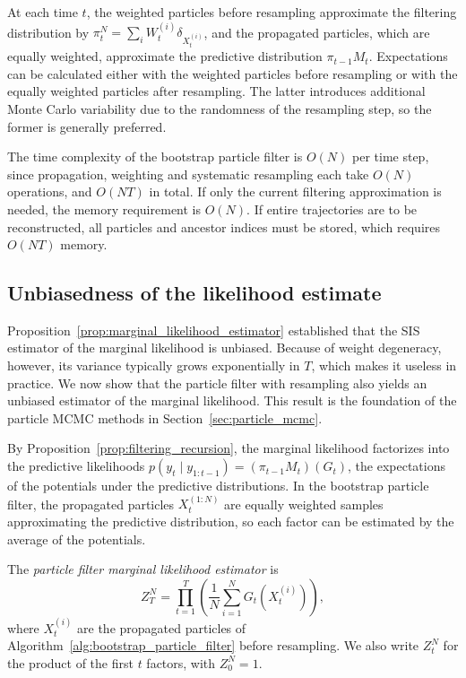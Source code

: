 At each time $t$, the weighted particles before resampling approximate the filtering distribution by $\pi_t^N = \sum_iW_t^{(i)}\delta_{X_t^{(i)}}$, and the propagated particles, which are equally weighted, approximate the predictive distribution $\pi_{t-1}M_t$. Expectations can be calculated either with the weighted particles before resampling or with the equally weighted particles after resampling. The latter introduces additional Monte Carlo variability due to the randomness of the resampling step, so the former is generally preferred.

The time complexity of the bootstrap particle filter is $O(N)$ per time step, since propagation, weighting and systematic resampling each take $O(N)$ operations, and $O(NT)$ in total. If only the current filtering approximation is needed, the memory requirement is $O(N)$. If entire trajectories are to be reconstructed, all particles and ancestor indices must be stored, which requires $O(NT)$ memory.

\subsection{Unbiasedness of the likelihood estimate}
\label{sec:pf_marginal_likelihood}
Proposition~\ref{prop:marginal_likelihood_estimator} established that the SIS estimator of the marginal likelihood is unbiased. Because of weight degeneracy, however, its variance typically grows exponentially in $T$, which makes it useless in practice. We now show that the particle filter with resampling also yields an unbiased estimator of the marginal likelihood. This result is the foundation of the particle MCMC methods in Section~\ref{sec:particle_mcmc}.

By Proposition~\ref{prop:filtering_recursion}, the marginal likelihood factorizes into the predictive likelihoods $p(y_t\mid y_{1:t-1}) = (\pi_{t-1}M_t)(G_t)$, the expectations of the potentials under the predictive distributions. In the bootstrap particle filter, the propagated particles $X_t^{(1:N)}$ are equally weighted samples approximating the predictive distribution, so each factor can be estimated by the average of the potentials.

\begin{definition}
    \label{def:pf_marginal_likelihood_estimator}
    The \emph{particle filter marginal likelihood estimator} is
    \begin{equation}
        Z_T^N = \prod_{t=1}^{T}\left(\frac{1}{N}\sum_{i=1}^{N}G_t(X_t^{(i)})\right),
        \label{eq:pf_marginal_likelihood_estimator}
    \end{equation}
    where $X_t^{(i)}$ are the propagated particles of Algorithm~\ref{alg:bootstrap_particle_filter} before resampling. We also write $Z_t^N$ for the product of the first $t$ factors, with $Z_0^N = 1$.
\end{definition}

